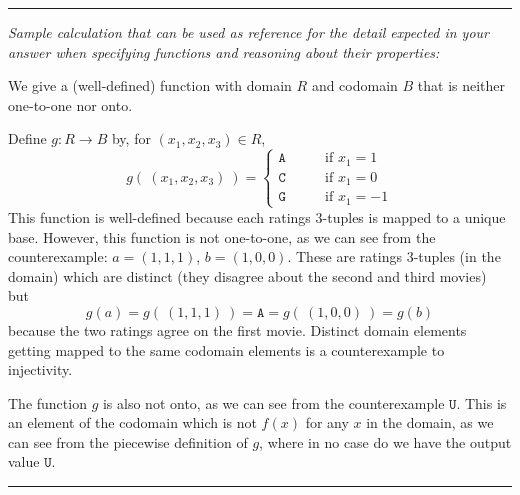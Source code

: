 \documentclass[12pt, oneside]{article}
\newcommand{\A}[0]{\texttt{A}}
\newcommand{\C}[0]{\texttt{C}}
\newcommand{\G}[0]{\texttt{G}}
\newcommand{\U}[0]{\texttt{U}}
\begin{document}
\begin{enumerate}
    \rule{0.5\textwidth}{.4pt}

    {\it Sample calculation that can be used as reference for the detail expected 
    in your answer when specifying functions and reasoning about their properties:} 
    
    We give a (well-defined) function with domain $R$ and codomain $B$ that is neither one-to-one nor onto.

    Define $g: R \to B$ by, for $(x_1, x_2,x_3) \in R$,
    \[
        g(~(x_1, x_2, x_3)~) = \begin{cases} 
            \A \qquad &\text{if $x_1 = 1$} \\
            \C \qquad &\text{if $x_1 = 0$} \\
            \G \qquad &\text{if $x_1 = -1$}
        \end{cases}
    \]
    This function is well-defined because each ratings $3$-tuples is mapped to a unique base.
    However, this function is not one-to-one, as we can see from the counterexample: 
    $a = (1,1,1)$, $b = (1, 0,0)$. These are ratings $3$-tuples (in the domain) which are 
    distinct (they disagree about the second and third movies) but
    \[
        g(a) = g(~(1,1,1)~) = \A = g(~(1,0,0)~) = g(b)
    \]
    because the two ratings agree on the first movie. Distinct domain 
    elements getting mapped to the same codomain elements is a counterexample to injectivity.

    The function $g$ is also not onto, as we can see from the counterexample $\U$. This is an 
    element of the codomain which is not $f(x)$ for any $x$ in the domain, as we can see 
    from the piecewise definition of $g$, where in no case do we have the output value $\U$.
    \rule{0.5\textwidth}{.4pt}


\end{enumerate}
\end{document}
